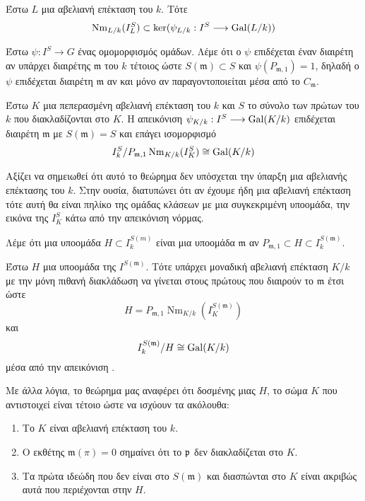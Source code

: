 \begin{cor} Έστω $L$ μια αβελιανή επέκταση του $k$. Τότε 
    $$\operatorname{Nm}_{L/k}(I^S_L) \subset \ker(\psi_{L/k}: I^S \longrightarrow \operatorname{Gal}(L/k))$$
\end{cor}

\begin{defn} Έστω $\psi: I^S \longrightarrow G$ ένας ομομορφισμός ομάδων. Λέμε ότι ο $\psi$ επιδέχεται έναν διαιρέτη αν υπάρχει διαιρέτης 
    $\mathfrak{m}$ του $k$ τέτοιος ώστε $S(\mathfrak{m}) \subset S$ και $\psi(P_{\mathfrak{m},1}) =1$, δηλαδή ο $\psi$ επιδέχεται διαιρέτη 
    $\mathfrak{m}$ αν και μόνο αν παραγοντοποιείται μέσα από το $C_\mathfrak{m}$.
\end{defn}

\begin{theorem}
    Έστω $K$ μια πεπερασμένη αβελιανή επέκταση του $k$ και $S$ το σύνολο των πρώτων του $k$ που διακλαδίζονται στο $K$. 
    Η απεικόνιση  $\psi_{K/k}:I^S \longrightarrow \operatorname{Gal}(K/k)$ επιδέχεται διαιρέτη $\mathfrak{m}$ με $S(\mathfrak{m}) = S$ 
    και επάγει ισομορφισμό
    $$I^S_k/ P_{\mathfrak{m},1}\operatorname{Nm}_{K/k}(I^S_K) \cong \operatorname{Gal}(K/k)$$
\end{theorem}

\noindent Αξίζει να σημειωθεί ότι αυτό το θεώρημα δεν υπόσχεται την ύπαρξη μια αβελιανής επέκτασης του $k$. Στην ουσία, διατυπώνει 
ότι αν έχουμε ήδη μια αβελιανή επέκταση τότε αυτή θα είναι πηλίκο της  ομάδας κλάσεων με μια συγκεκριμένη υποομάδα, 
την εικόνα της $I^S_K$ κάτω από την απεικόνιση νόρμας.

\begin{defn}
    Λέμε ότι μια υποομάδα $H\subset I^{S(m)}_k$ είναι μια  υποομάδα  $\mathfrak{m}$ αν $P_{\mathfrak{m},1} 
    \subset H \subset I^{S(\mathfrak{m})}_k$.
\end{defn}

\begin{theorem} Έστω $H$ μια  υποομάδα της $I^{S(\mathfrak{m})}$. Τότε υπάρχει μοναδική αβελιανή επέκταση $K/k$ με την μόνη πιθανή διακλάδωση να γίνεται στους πρώτους που διαιρούν το $\mathfrak{m}$ έτσι ώστε
    $$H = P_{\mathfrak{m},1} \operatorname{Nm}_{K/k}(I^{S(\mathfrak{m})}_K)$$ και 
    $$I^{S(\mathfrak{m})}_k / H \cong \operatorname{Gal}(K/k)$$ μέσα από την απεικόνιση .
\end{theorem}

\noindent Με άλλα λόγια, το θεώρημα μας αναφέρει ότι δοσμένης μιας $H$, το σώμα $K$ που αντιστοιχεί είναι τέτοιο ώστε να ισχύουν τα ακόλουθα:
\begin{enumerate}
    \item Το $K$ είναι αβελιανή επέκταση του $k$.
    \item Ο εκθέτης $\mathfrak{m}(\pi) =0$ σημαίνει ότι το $\mathfrak{p}$ δεν διακλαδίζεται στο $K$.
    \item Τα πρώτα ιδεώδη που δεν είναι στο $S(\mathfrak{m})$ και διασπώνται στο $K$ είναι ακριβώς αυτά που περιέχονται στην $H$.
\end{enumerate}

